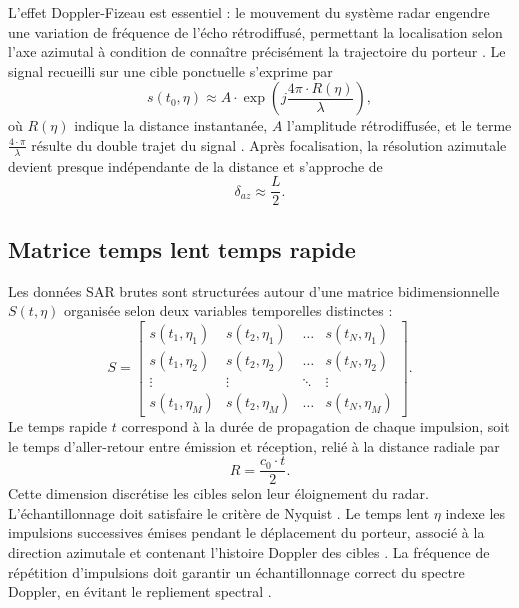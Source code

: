 L'effet Doppler-Fizeau est essentiel : le mouvement du système radar engendre une variation de fréquence de l'écho rétrodiffusé, permettant la localisation selon l'axe azimutal à condition de connaître précisément la trajectoire du porteur \cite{curlander1991sar, bamler1992comparison}. Le signal recueilli sur une cible ponctuelle s'exprime par
\begin{equation}
s(t_0,\eta) \approx A\cdot\exp\left(j \frac{4\pi \cdot R(\eta)}{\lambda}\right),
\label{eq:signal_retrodiffuse_sar}
\end{equation}
où $R(\eta)$ indique la distance instantanée, $A$ l'amplitude rétrodiffusée, et le terme $\frac{4\cdot\pi}{\lambda}$ résulte du double trajet du signal \cite{cumming2005}. Après focalisation, la résolution azimutale devient presque indépendante de la distance et s'approche de
\begin{equation}
\delta_{az} \approx \frac{L}{2}.
\label{eq:resolution_azimutale}
\end{equation}

\subsection{Matrice temps lent temps rapide}

Les données SAR brutes sont structurées autour d'une matrice bidimensionnelle $S(t,\eta)$ organisée selon deux variables temporelles distinctes \cite{cumming2005, curlander1991sar} :
\begin{equation}
    S = 
    \begin{bmatrix}
       s(t_1,\eta_1) & s(t_2,\eta_1) & \dots & s(t_N,\eta_1) \\
        s(t_1,\eta_2) & s(t_2,\eta_2) & \dots & s(t_N,\eta_2) \\
        \vdots & \vdots & \ddots & \vdots \\
        s(t_1,\eta_M) & s(t_2,\eta_M) & \dots & s(t_N,\eta_M) 
    \end{bmatrix}.
    \label{eq:matrice_tps_lent_tps_rapide}
\end{equation}
Le temps rapide $t$ correspond à la durée de propagation de chaque impulsion, soit le temps d'aller-retour entre émission et réception, relié à la distance radiale par
\begin{equation}
R = \frac{c_0 \cdot t}{2}.
\label{eq:distance_radiale_sar}
\end{equation}
Cette dimension discrétise les cibles selon leur éloignement du radar. L'échantillonnage doit satisfaire le critère de Nyquist \cite{bamler1992comparison}. Le temps lent $\eta$ indexe les impulsions successives émises pendant le déplacement du porteur, associé à la direction azimutale et contenant l'histoire Doppler des cibles \cite{cumming2005}. La fréquence de répétition d'impulsions doit garantir un échantillonnage correct du spectre Doppler, en évitant le repliement spectral \cite{rosen2000sar, elachi2006remote}.

